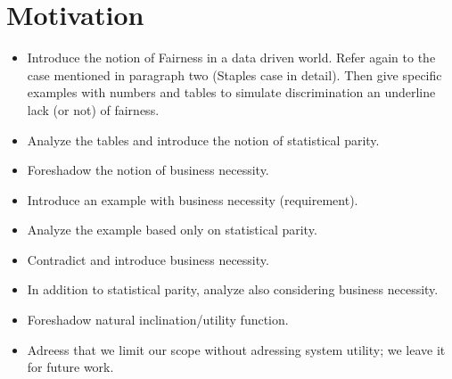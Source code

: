 \section{Motivation}
\begin{itemize}
  \item Introduce the notion of Fairness in a data driven world. Refer again to the case mentioned
    in paragraph two (Staples case in detail). Then give specific examples with numbers and tables
    to simulate discrimination an underline lack (or not) of fairness.
  \item Analyze the tables and introduce the notion of statistical parity.
  \item Foreshadow the notion of business necessity.
  \item Introduce an example with business necessity (requirement).
  \item Analyze the example based only on statistical parity.
  \item Contradict and introduce business necessity.
  \item In addition to statistical parity, analyze also considering
    business necessity.
  \item Foreshadow natural inclination/utility function.
  \item Adreess that we limit our scope without adressing system utility; we leave it for future work.
\end{itemize}
